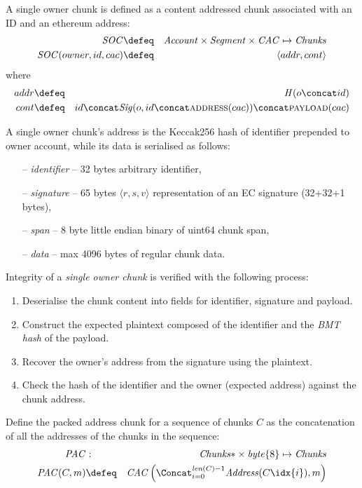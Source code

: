 \begin{definition}
\label{def:soc}
A single owner chunk  is defined as a content addressed chunk associated with an ID and an ethereum address: 
%
\begin{eqnarray}
\mathit{SOC} &\defeq& \mathit{Account}\times\mathit{Segment}\times\mathit{CAC}\mapsto\mathit{Chunks}\\
\mathit{SOC}(owner,id,cac)&\defeq& \langle addr, cont\rangle
\end{eqnarray}
%
where
%
\begin{eqnarray}
addr&\defeq& \mathit{H}(o\concat id)\\
cont &\defeq& id\concat\mathit{Sig}(o, id\concat\textsc{address}(cac))\concat \textsc{payload}(cac)
\end{eqnarray}

A single owner chunk's address is the Keccak256 hash of identifier prepended to owner account, while its data is serialised as follows:
\begin{itemize}[noitemsep]
    \item[--] \emph{identifier} -- 32 bytes arbitrary identifier, 
    \item[--] \emph{signature} -- 65 bytes $\langle r,s,v \rangle$ representation of an EC signature (32+32+1 bytes),
    \item[--] \emph{span} -- 8 byte little endian binary of uint64 chunk span,
    \item[--] \emph{data} -- max 4096 bytes of regular chunk data.
\end{itemize}

Integrity of a \emph{single owner chunk} is verified with the following process:
\begin{enumerate}[noitemsep]
    \item Deserialise the chunk content into fields for identifier, signature and payload.
    \item Construct the expected plaintext composed of the identifier and the \emph{BMT hash} of the payload.
    \item Recover the owner's address from the signature using the plaintext.
    \item Check the hash of the identifier and the owner (expected address) against the chunk address.
\end{enumerate}

\end{definition}

\begin{definition}
\label{def:pac}
Define the packed address chunk for a sequence of chunks $C$ as the concatenation of all the addresses of the chunks in the sequence:
\begin{eqnarray}
\mathit{PAC}&:&\mathit{Chunks}{*}\times\mathit{byte}\{8\}\mapsto\mathit{Chunks}\\
\mathit{PAC}(C,m)&\defeq&\mathit{CAC}\left(\Concat_{i=0}^{\mathit{len}(C)-1} \mathit{Address}(C\idx{i}), m\right)
\end{eqnarray}
\end{definition}

